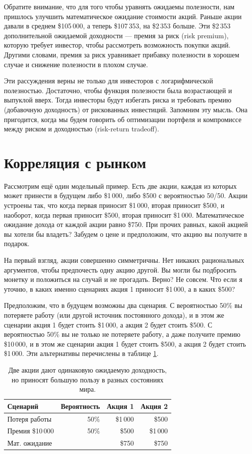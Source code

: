  Обратите внимание, что для того чтобы уравнять ожидаемы полезности, нам пришлось улучшить математическое ожидание стоимости акций. Раньше акции давали в среднем \$105\,000, а теперь \$107\,353, на \$2\,353 больше. Эти \$2\,353 дополнительной ожидаемой доходности --- премия за риск (risk premium), которую требует инвестор, чтобы рассмотреть возможность покупки акций. Другими словами, премия за риск уравнивает прибавку полезности в хорошем случае и снижение полезности в плохом случае. 
 
 Эти рассуждения верны не только для инвесторов с логарифмической полезностью. Достаточно, чтобы функция полезности была возрастающей и выпуклой вверх. Тогда инвесторы будут избегать риска и требовать премию (добавочную доходность) от рискованных инвестиций. Запомним эту мысль. Она пригодится, когда мы будем говорить об оптимизации портфеля и компромиссе между риском и доходностью (risk-return tradeoff).

\section*{Корреляция с рынком}

Рассмотрим ещё один модельный пример. Есть две акции, каждая из которых может принести в будущем либо \$1\,000, либо \$500 с вероятностью 50/50. Акции устроены так, что когда первая приносит \$1\,000, вторая приносит \$500, и наоборот, когда первая приносит \$500, вторая приносит \$1\,000. Математическое ожидание дохода от каждой акции равно \$750. При прочих равных, какой акцией вы хотели бы владеть? Забудем о цене и предположим, что акцию вы получите в подарок.

На первый взгляд, акции совершенно симметричны. Нет никаких рациональных аргументов, чтобы предпочесть одну акцию другой. Вы могли бы подбросить монетку и положиться на случай и не прогадать. Верно? Не совсем. Что если я уточню, в каких именно сценариях акция 1 приносит \$1\,000, а в каких \$500?

Предположим, что в будущем возможны два сценария. С вероятностью 50\% вы потеряете работу (или другой источник постоянного дохода), и в этом же сценарии акция 1 будет стоить \$1\,000, а акция 2 будет стоить \$500. С вероятностью 50\% вы не только не потеряете работу, а даже получите премию \$10\,000, и в этом же сценарии акция 1 будет стоить \$500, а акция 2 будет стоить \$1\,000. Эти альтернативы перечислены в таблице \ref{two_shares_states_of_nature}.

\begin{table}[h!]
\centering
\begin{tabular}{l|r|r|r}
Сценарий                 & Вероятность & Акция 1 & Акция 2 \\  \hline
Потеря работы      & 50\%                 & \$1\,000 & \$500 \\
Премия \$10\,000 & 50\%                 & \$500      & \$1\,000 \\ \hline
\multicolumn{2}{l|}{Мат. ожидание} & \$750 & \$750 
\end{tabular}
\caption{Две акции дают одинаковую ожидаемую доходность, но приносят большую пользу в разных состояниях мира.}
\label{two_shares_states_of_nature}
\end{table}

